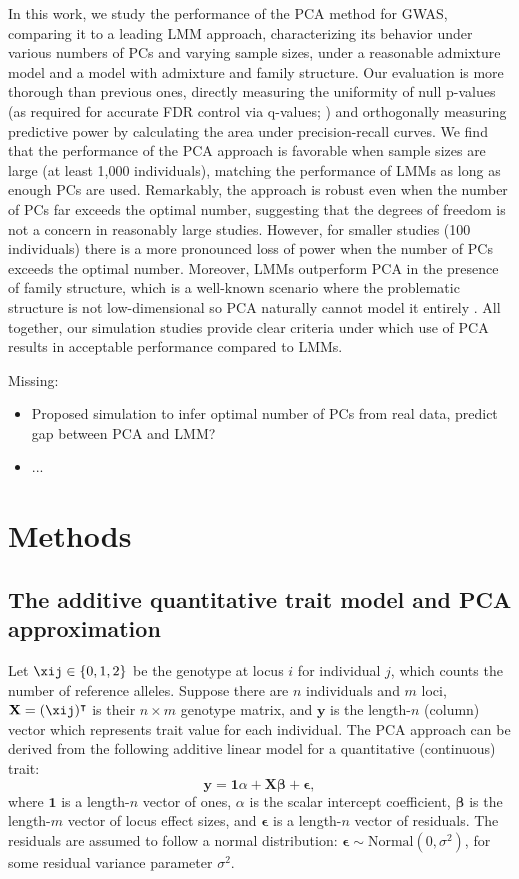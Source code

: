 \documentclass[12pt]{article}
\begin{document}
In this work, we study the performance of the PCA method for GWAS, comparing it to a leading LMM approach, characterizing its behavior under various numbers of PCs and varying sample sizes, under a reasonable admixture model and a model with admixture and family structure.
Our evaluation is more thorough than previous ones, directly measuring the uniformity of null p-values (as required for accurate FDR control via q-values; \cite{storey_positive_2003, storey_statistical_2003}) and orthogonally measuring predictive power by calculating the area under precision-recall curves.
We find that the performance of the PCA approach is favorable when sample sizes are large (at least 1,000 individuals), matching the performance of LMMs as long as enough PCs are used.
Remarkably, the approach is robust even when the number of PCs far exceeds the optimal number, suggesting that the degrees of freedom is not a concern in reasonably large studies.
However, for smaller studies (100 individuals) there is a more pronounced loss of power when the number of PCs exceeds the optimal number.
Moreover, LMMs outperform PCA in the presence of family structure, which is a well-known scenario where the problematic structure is not low-dimensional so PCA naturally cannot model it entirely \citep{patterson_population_2006, price_new_2010}.
All together, our simulation studies provide clear criteria under which use of PCA results in acceptable performance compared to LMMs.

Missing:
\begin{itemize}
\item Proposed simulation to infer optimal number of PCs from real data, predict gap between PCA and LMM?
\item ...
\end{itemize}

\section{Methods}

\subsection{The additive quantitative trait model and PCA approximation}

Let $\xij \in \{ 0, 1, 2 \}$ be the genotype at locus $i$ for individual $j$, which counts the number of reference alleles.
Suppose there are $n$ individuals and $m$ loci,
$\mathbf{X} = ( \xij )^\intercal$ is their $n \times m$ genotype matrix, and
$\mathbf{y}$ is the length-$n$ (column) vector which represents trait value for each individual.
The PCA approach can be derived from the following additive linear model for a quantitative (continuous) trait:
$$
\mathbf{y}
=
\mathbf{1} \alpha + \mathbf{X} \mathbf{\beta} + \mathbf{\epsilon}
,
$$
where
$\mathbf{1}$ is a length-$n$ vector of ones,
$\alpha$ is the scalar intercept coefficient,
$\mathbf{\beta}$ is the length-$m$ vector of locus effect sizes, and
$\mathbf{\epsilon}$ is a length-$n$ vector of residuals.
The residuals are assumed to follow a normal distribution: $\mathbf{\epsilon} \sim \text{Normal}(0, \sigma^2)$, for some residual variance parameter $\sigma^2$.
\end{document}
